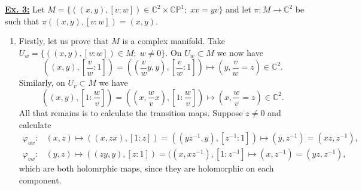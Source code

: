 \documentclass[a4paper, 12pt]{article} %
\newcommand{\C}{\mathbb{C}}
\renewcommand{\P}{\mathbb{P}}
\begin{document}
\underline{\textbf{Ex. 3:}}
Let $M = \lbrace((x, y), [v: w]) \in \C^2 \times \C\P^1 ; \; xv = yv \rbrace$ and let $\pi\colon M \to \C^2$ be such that $\pi((x, y),[v:w]) = (x, y)$.
\begin{enumerate}[label=(\alph*)]
	\item Firstly, let us prove that $M$ is a complex manifold. Take $U_w = \lbrace((x, y), [v: w]) \in M ; \; w \neq 0 \rbrace$. On $U_w \subset M$ we now have
	\[
	((x, y),[\frac{v}{w}:1]) = ((\frac{v}{w}y, y), [\frac{v}{w}: 1]) \mapsto (y, \frac{v}{w} = z) \in \C^2.
	\]
	Similarly, on $U_v \subset M$ we have
	\[
	((x, y),[1:\frac{w}{v}]) = ((x, \frac{w}{v}x), [1:\frac{w}{v}]) \mapsto (x, \frac{w}{v} = z) \in \C^2.
	\]
	All that remains is to calculate the transition maps. Suppose $z \neq 0$ and calculate
	\begin{align*}
	\varphi_{wv}\colon & (x, z) \mapsto ((x, zx), [1:z]) = ((yz^{-1}, y), [z^{-1}:1]) \mapsto (y, z^{-1}) = (xz, z^{-1}), \\
	\varphi_{vw}\colon & (y, z) \mapsto ((zy, y),[z:1]) = ((x, xz^{-1}),[1:z^{-1}] \mapsto (x, z^{-1}) = (yz, z^{-1}),
	\end{align*}
	which are both holomrphic maps, since they are holomorphic on each component.
	

\end{enumerate}
\end{document}
